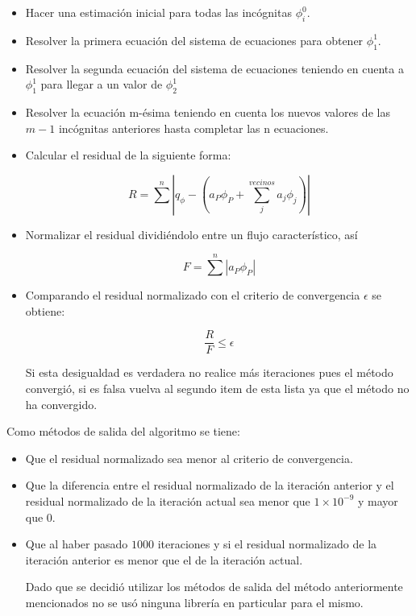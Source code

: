 \documentclass[article,latterpaper]{IEEEtran}
\begin{document}
\begin{itemize}
	\item Hacer una estimación inicial para todas las incógnitas $\phi_{i}^0$.
	\item Resolver la primera ecuación del sistema de ecuaciones para obtener $\phi_{1}^1$.
	\item Resolver la segunda ecuación del sistema de ecuaciones teniendo en cuenta a $\phi_{1}^1$ para llegar a un valor de $\phi_{2}^1$
	\item Resolver la ecuación m-ésima teniendo en cuenta los nuevos valores de las $m-1$ incógnitas anteriores hasta completar las n ecuaciones.
	\item Calcular el residual de la siguiente forma:
	
	\begin{equation}
    	R=\sum^n|q_{\phi} - (a_P\phi_P + \sum_{j}^{vecinos} a_j\phi_j)|
    	\label{Res}
	\end{equation}
	
	\item Normalizar el residual dividiéndolo entre un flujo característico, así
	
	\begin{equation}
    	F=\sum^n|a_P\phi_P|
    	\label{Flujo_C}
	\end{equation}
	
	\item Comparando el residual normalizado con el criterio de convergencia $\epsilon$ se obtiene:
	
	\begin{equation}
    	\frac{R}{F}\leq\epsilon
    	\label{Res_norm}
	\end{equation}
	
	Si esta desigualdad es verdadera no realice más iteraciones pues el método convergió, si es falsa vuelva al segundo item de esta lista ya que el método no ha convergido.
\end{itemize}

Como métodos de salida del algoritmo se tiene:
\begin{itemize}
    \item Que el residual normalizado sea menor al criterio de convergencia.
    \item Que la diferencia entre el residual normalizado de la iteración anterior y el residual normalizado de la iteración actual sea menor que $1\times 10^{-9}$ y mayor que $0$.
    \item Que al haber pasado $1000$ iteraciones y si el residual normalizado de la iteración anterior es menor que el de la iteración actual.
    
Dado que se decidió utilizar los métodos de salida del método anteriormente mencionados no se usó ninguna librería en particular para el mismo.
\end{itemize}
\end{document}
